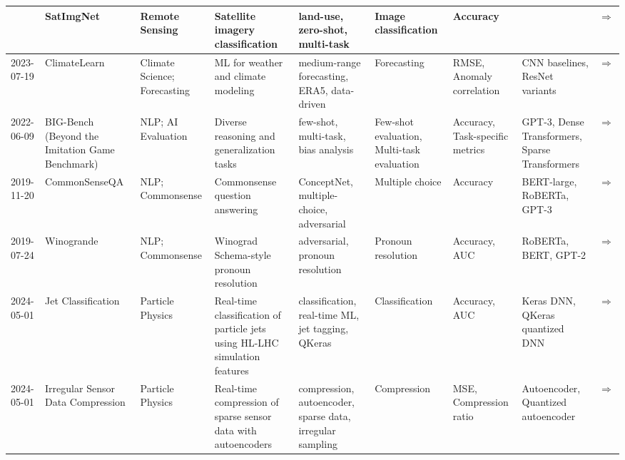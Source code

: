 \begin{landscape}
\begin{longtable}{|p{2cm}|p{2cm}|p{2cm}|p{2cm}|p{2cm}|p{2cm}|p{2cm}|p{2cm}|p{2cm}|}
 & SatImgNet & Remote Sensing & Satellite imagery classification & land-use, zero-shot, multi-task & Image classification & Accuracy &  & \cite{roberts2023satinmultitaskmetadatasetclassifying}\href{https://arxiv.org/abs/2304.11619}{$\Rightarrow$} \\ \hline
2023-07-19 & ClimateLearn & Climate Science; Forecasting & ML for weather and climate modeling & medium-range forecasting, ERA5, data-driven & Forecasting & RMSE, Anomaly correlation & CNN baselines, ResNet variants & \cite{nguyen2023climatelearnbenchmarkingmachinelearning}\href{https://arxiv.org/abs/2307.01909}{$\Rightarrow$} \\ \hline
2022-06-09 & BIG-Bench (Beyond the Imitation Game Benchmark) & NLP; AI Evaluation & Diverse reasoning and generalization tasks & few-shot, multi-task, bias analysis & Few-shot evaluation, Multi-task evaluation & Accuracy, Task-specific metrics & GPT-3, Dense Transformers, Sparse Transformers & \cite{srivastava2023imitationgamequantifyingextrapolating}\href{https://github.com/google/BIG-bench}{$\Rightarrow$} \\ \hline
2019-11-20 & CommonSenseQA & NLP; Commonsense & Commonsense question answering & ConceptNet, multiple-choice, adversarial & Multiple choice & Accuracy & BERT-large, RoBERTa, GPT-3 & \cite{talmor2019commonsenseqaquestionansweringchallenge}\href{https://paperswithcode.com/paper/commonsenseqa-a-question-answering-challenge}{$\Rightarrow$} \\ \hline
2019-07-24 & Winogrande & NLP; Commonsense & Winograd Schema-style pronoun resolution & adversarial, pronoun resolution & Pronoun resolution & Accuracy, AUC & RoBERTa, BERT, GPT-2 & \cite{sakaguchi2019winograndeadversarialwinogradschema}\href{https://leaderboard.allenai.org/winogrande/submissions/public}{$\Rightarrow$} \\ \hline
2024-05-01 & Jet Classification & Particle Physics & Real-time classification of particle jets using HL-LHC simulation features & classification, real-time ML, jet tagging, QKeras & Classification & Accuracy, AUC & Keras DNN, QKeras quantized DNN & \cite{hawks2022fastml}\href{https://github.com/fastmachinelearning/fastml-science/tree/main/jet-classify}{$\Rightarrow$} \\ \hline
2024-05-01 & Irregular Sensor Data Compression & Particle Physics & Real-time compression of sparse sensor data with autoencoders & compression, autoencoder, sparse data, irregular sampling & Compression & MSE, Compression ratio & Autoencoder, Quantized autoencoder & \cite{hawks2022fastml2}\href{https://github.com/fastmachinelearning/fastml-science/tree/main/sensor-data-compression}{$\Rightarrow$} \\ \hline

\end{longtable}
\end{landscape}
